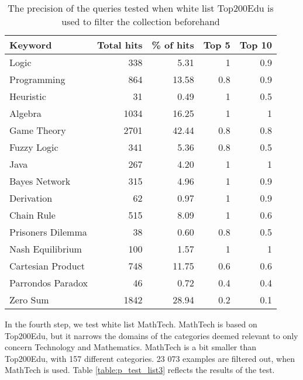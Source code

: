 \begin{table}[H]
\centering
\begin{tabular} {|| p{10em} | r | r | r | r ||} 
 \hline
 Keyword & Total hits & \% of hits & Top 5 & Top 10 \\ [0.5ex] 
 \hline

Logic & 338 & 5.31 & 1 & 0.9 \\
Programming & 864 & 13.58 & 0.8 & 0.9 \\
Heuristic & 31 & 0.49 & 1 & 0.5 \\
Algebra & 1034 & 16.25 & 1 & 1 \\
Game Theory & 2701 & 42.44 & 0.8 & 0.8 \\
\hline
Fuzzy Logic & 341 & 5.36 & 0.8 & 0.5 \\
Java & 267 & 4.20 & 1 & 1 \\
Bayes Network & 315 & 4.96 & 1 & 0.9 \\
Derivation & 62 & 0.97 & 1 & 0.9 \\
\hline
Chain Rule & 515 & 8.09 & 1 & 0.6 \\
Prisoners Dilemma & 38 & 0.60 & 0.8 & 0.5 \\
Nash Equilibrium & 100 & 1.57 & 1 & 1 \\
Cartesian Product & 748 & 11.75 & 0.6 & 0.6 \\
Parrondos Paradox & 46 & 0.72 & 0.4 & 0.4 \\
Zero Sum & 1842 & 28.94 & 0.2 & 0.1 \\

 \hline
\end{tabular}
\caption{The precision of the queries tested when white list Top200Edu is used to filter the collection beforehand}
\label{table:p_test_list2}
\end{table}

In the fourth step, we test white list MathTech. MathTech is based on Top200Edu, but it narrows the domains of the categories deemed relevant to only concern Technology and Mathematics. MathTech is a bit smaller than Top200Edu, with 157 different categories. 23 073 examples are filtered out, when MathTech is used. Table \ref{table:p_test_list3} reflects the results of the test.

